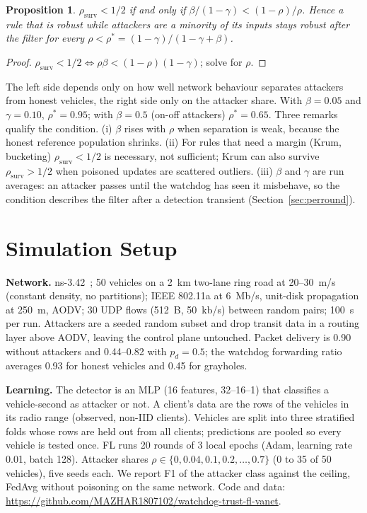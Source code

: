 \documentclass[conference]{IEEEtran}
\newtheorem{proposition}{Proposition}
\newcommand{\rsurv}{\rho_{\mathrm{surv}}}
\begin{document}
\begin{proposition}
\label{prop:cond}
$\rsurv < 1/2$ if and only if $\beta/(1-\gamma) < (1-\rho)/\rho$. Hence a rule that is robust while attackers are a
minority of its inputs stays robust after the filter for every $\rho < \rho^* = (1-\gamma)/(1-\gamma+\beta)$.
\end{proposition}
\begin{proof}
$\rsurv < 1/2 \iff \rho\beta < (1-\rho)(1-\gamma)$; solve for $\rho$.
\end{proof}

The left side depends only on how well network behaviour separates attackers from honest vehicles, the right side
only on the attacker share. With $\beta = 0.05$ and $\gamma = 0.10$, $\rho^* = 0.95$; with $\beta = 0.5$ (on-off
attackers) $\rho^* = 0.65$. Three remarks qualify the condition. (i) $\beta$ rises with $\rho$ when separation is
weak, because the honest reference population shrinks. (ii) For rules that need a margin (Krum, bucketing)
$\rsurv < 1/2$ is necessary, not sufficient; Krum can also survive $\rsurv > 1/2$ when poisoned updates are scattered
outliers. (iii) $\beta$ and $\gamma$ are run averages: an attacker passes until the watchdog has seen it misbehave, so
the condition describes the filter after a detection transient (Section~\ref{sec:perround}).

\section{Simulation Setup}
\label{sec:setup}

\textbf{Network.} ns-3.42~\cite{riley2010ns3}; 50 vehicles on a 2~km two-lane ring road at 20--30~m/s (constant density, no partitions);
IEEE 802.11a at 6~Mb/s, unit-disk propagation at 250~m, AODV; 30 UDP flows (512~B, 50~kb/s) between random pairs;
100~s per run. Attackers are a seeded random subset and drop transit data in a routing layer above AODV, leaving the
control plane untouched. Packet delivery is 0.90 without attackers and 0.44--0.82 with $p_d = 0.5$; the watchdog
forwarding ratio averages 0.93 for honest vehicles and 0.45 for grayholes.

\textbf{Learning.} The detector is an MLP (16 features, 32--16--1) that classifies a vehicle-second as attacker or
not. A client's data are the rows of the vehicles in its radio range (observed, non-IID clients). Vehicles are split
into three stratified folds whose rows are held out from all clients; predictions are pooled so every vehicle is
tested once. FL runs 20 rounds of 3 local epochs (Adam, learning rate 0.01, batch 128). Attacker shares
$\rho \in \{0, 0.04, 0.1, 0.2, \dots, 0.7\}$ (0 to 35 of 50 vehicles), five seeds each. We report F1 of the attacker
class against the ceiling, FedAvg without poisoning on the same network. Code and data: \url{https://github.com/MAZHAR1807102/watchdog-trust-fl-vanet}.
\end{document}
